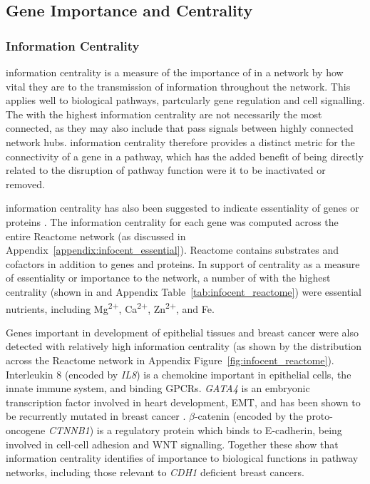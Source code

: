 \FloatBarrier

\subsection{Gene Importance and Centrality}  \label{chapt4:Network_Centrality}

\subsubsection{Information Centrality}  \label{chapt4:Network_InfoCent}

\Gls{information centrality} is a measure of the importance of  in a network by how vital they are to the transmission of information throughout the network. This applies well to biological pathways, partcularly gene regulation and cell signalling. The  with the highest \gls{information centrality} are not necessarily the most connected, as they may also include  that pass signals between highly connected network hubs. \Gls{information centrality} therefore provides a distinct metric for the connectivity of a gene in a pathway, which has the added benefit of being directly related to the disruption of pathway function were it to be inactivated or removed.

\Gls{information centrality} has also been suggested to indicate essentiality of genes or proteins \citep{Kranthi2013}. The \gls{information centrality} for each gene was computed across the entire Reactome network (as discussed in Appendix~\ref{appendix:infocent_essential}). Reactome contains substrates and cofactors in addition to genes and proteins. In support of \gls{centrality} as a measure of essentiality or importance to the network, a number of  with the highest \gls{centrality} (shown in and Appendix Table~\ref{tab:infocent_reactome}) were \gls{essential} nutrients, including Mg\textsuperscript{2$+$}, Ca\textsuperscript{2$+$}, Zn\textsuperscript{2$+$}, and Fe.%

Genes important in development of epithelial tissues and breast cancer were also detected with relatively high \gls{information centrality} (as shown by the distribution across the Reactome network in Appendix Figure~\ref{fig:infocent_reactome}). Interleukin 8 (encoded by \textit{IL8}) is a chemokine important in epithelial cells, the innate immune system, and binding \glspl{GPCR}. \textit{GATA4} is an embryonic transcription factor involved in heart development, \gls{EMT}, and has been shown to be recurrently mutated in breast cancer \citep{TCGA2012}. $\beta$-catenin (encoded by the \gls{proto-oncogene} \textit{CTNNB1}) is a regulatory protein which binds to \gls{E-cadherin}, being involved in cell-cell adhesion and \gls{WNT} signalling. Together these show that \gls{information centrality} identifies  of importance to biological functions in pathway networks, including those relevant to \textit{CDH1} deficient breast cancers. 

